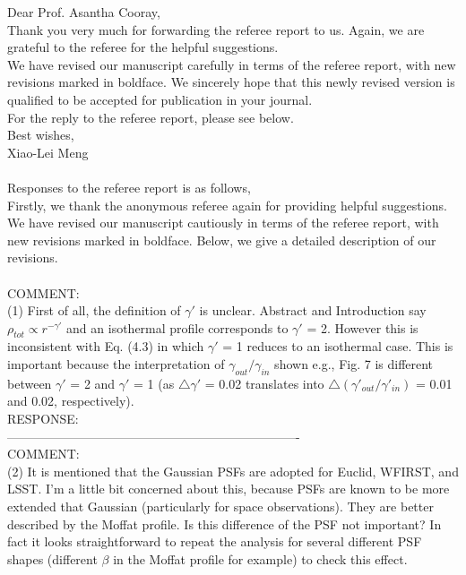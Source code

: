 \documentclass[a4paper,11pt]{article}
\begin{document}
Dear Prof. Asantha Cooray,
\\

Thank you very much for forwarding the referee report to us. Again, we are grateful to the referee for the helpful suggestions.
\\

We have revised our manuscript carefully in terms of the referee report, with new revisions marked in boldface. We sincerely hope that this newly revised version is qualified to be accepted for publication in your journal.
\\

For the reply to the referee report, please see below.
\\

Best wishes,
\\

Xiao-Lei Meng
\\
\\

Responses to the referee report is as follows,
\\

Firstly, we thank the anonymous referee again for providing helpful suggestions. We have revised our manuscript cautiously in terms of the referee report, with new revisions marked in boldface. Below, we give a detailed description of our revisions.
\\
\\
COMMENT:
\\
(1) First of all, the definition of $\gamma'$ is unclear. Abstract and Introduction say $\rho_{tot} \propto r^{-\gamma'}$ and an isothermal profile corresponds to $\gamma'$ = 2. However this is inconsistent with Eq. (4.3) in which $\gamma'$ = 1 reduces to an isothermal case. This is important because the  interpretation of $\gamma_{out}/\gamma_{in}$ shown e.g., Fig. 7 is different between $\gamma'$ = 2 and $\gamma'$ = 1 (as $\bigtriangleup \gamma'$ = 0.02 translates into $\bigtriangleup (\gamma'_{out}/\gamma'_{in})$ = 0.01 and 0.02, respectively).
\\

RESPONSE:
\\


----------------------------------------------------------------------
\\
COMMENT:
\\
(2) It is mentioned that the Gaussian PSFs are adopted for Euclid, WFIRST, and LSST. I’m a little bit concerned about this, because PSFs are known to be more extended that Gaussian (particularly for space observations). They are better described by the Moffat profile. Is this difference of the PSF not important? In fact it looks straightforward to repeat the analysis for several different PSF shapes (different $\beta$ in the Moffat profile for example) to check this effect.
\\
\end{document}
